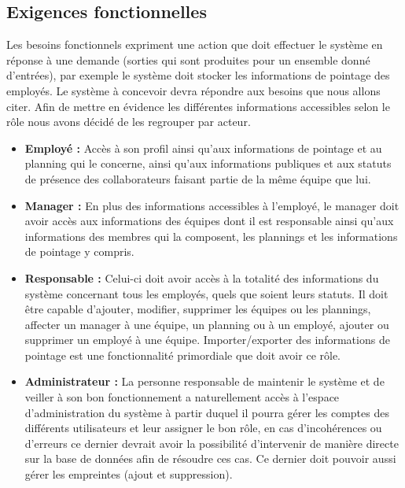             \subsection{Exigences fonctionnelles}
                Les besoins fonctionnels expriment une action que doit effectuer le système en réponse à une demande (sorties qui sont produites pour un ensemble donné d’entrées), par exemple le système doit stocker les informations de pointage des employés.  
                Le système à concevoir devra répondre aux besoins que nous allons citer. Afin de mettre en évidence les différentes informations accessibles selon le rôle nous avons décidé de les regrouper par acteur.
                \begin{itemize}
                    \item [\textbullet] \textbf{Employé :}
                        Accès à son profil ainsi qu’aux informations de pointage et au planning qui le concerne, ainsi qu’aux informations publiques et aux statuts de présence des collaborateurs faisant partie de la même équipe que lui.
                        
                    \item [\textbullet] \textbf{Manager :}
                        En plus des informations accessibles à l’employé, le manager doit avoir accès aux informations des équipes dont il est responsable ainsi qu’aux informations des membres qui la composent, les plannings et les informations de pointage y compris.
                        
            
                    \item [\textbullet] \textbf{Responsable :}
                        Celui-ci doit avoir accès à la totalité des informations du système concernant tous les employés, quels que soient leurs statuts. Il doit être capable d’ajouter, modifier, supprimer les équipes ou les plannings, affecter un manager à une équipe, un planning ou à un employé, ajouter ou supprimer un employé à une équipe. Importer/exporter des informations de pointage est une fonctionnalité primordiale que doit avoir ce rôle.
                        
                    \item [\textbullet] \textbf{Administrateur :}
                        La personne responsable de maintenir le système et de veiller à son bon fonctionnement a naturellement accès à l’espace d’administration du système à partir duquel il pourra gérer les comptes des différents utilisateurs et leur assigner le bon rôle, en cas d’incohérences ou d’erreurs ce dernier devrait avoir la possibilité d’intervenir de manière directe sur la base de données afin de résoudre ces cas. Ce dernier doit pouvoir aussi gérer les empreintes (ajout et suppression).
            
                \end{itemize}
                
